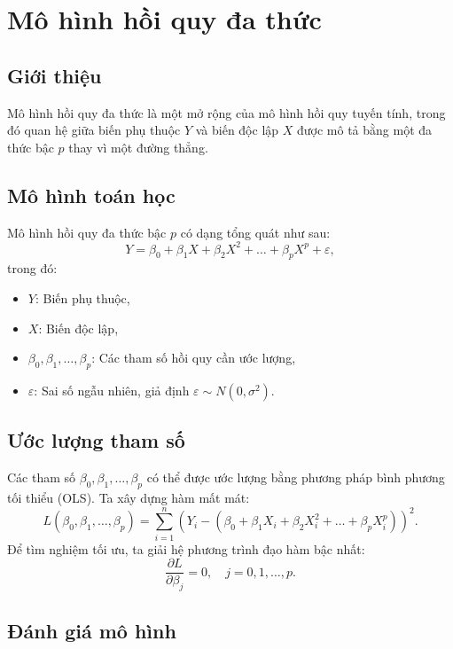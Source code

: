 \chapter{Mô hình hồi quy đa thức}
\section{Giới thiệu}
Mô hình hồi quy đa thức là một mở rộng của mô hình hồi quy tuyến tính, trong đó quan hệ giữa biến phụ thuộc $Y$ và biến độc lập $X$ được mô tả bằng một đa thức bậc $p$ thay vì một đường thẳng.

\section{Mô hình toán học}
Mô hình hồi quy đa thức bậc $p$ có dạng tổng quát như sau:
\begin{equation}
    Y = \beta_0 + \beta_1 X + \beta_2 X^2 + \dots + \beta_p X^p + \varepsilon,
\end{equation}
trong đó:
\begin{itemize}
    \item $Y$: Biến phụ thuộc,
    \item $X$: Biến độc lập,
    \item $\beta_0, \beta_1, \dots, \beta_p$: Các tham số hồi quy cần ước lượng,
    \item $\varepsilon$: Sai số ngẫu nhiên, giả định $\varepsilon \sim N(0, \sigma^2)$.
\end{itemize}

\section{Ước lượng tham số}
Các tham số $\beta_0, \beta_1, \dots, \beta_p$ có thể được ước lượng bằng phương pháp bình phương tối thiểu (OLS). Ta xây dựng hàm mất mát:
\begin{equation}
    L(\beta_0, \beta_1, \dots, \beta_p) = \sum_{i=1}^{n} \left( Y_i - (\beta_0 + \beta_1 X_i + \beta_2 X_i^2 + \dots + \beta_p X_i^p) \right)^2.
\end{equation}
Để tìm nghiệm tối ưu, ta giải hệ phương trình đạo hàm bậc nhất:
\begin{equation}
    \frac{\partial L}{\partial \beta_j} = 0, \quad j = 0, 1, \dots, p.
\end{equation}

\section{Đánh giá mô hình}
